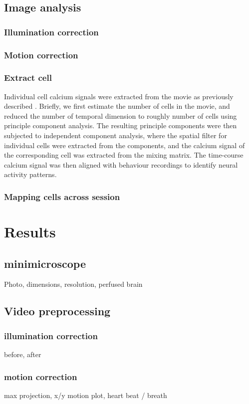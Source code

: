 \subsection{Image analysis}
\subsubsection{Illumination correction}
\subsubsection{Motion correction}
\subsubsection{Extract cell}
Individual cell calcium signals were extracted from the movie as previously described \citep{mukamel09}. Briefly, we first estimate the number of cells in the movie, and reduced the number of temporal dimension to roughly number of cells using principle component analysis. The resulting principle components were then subjected to independent component analysis, where the spatial filter for individual cells were extracted from the components, and the calcium signal of the corresponding cell was extracted from the mixing matrix. The time-course calcium signal was then aligned with behaviour recordings to identify neural activity patterns.
\subsubsection{Mapping cells across session}


\section{Results}


\subsection{minimicroscope}
Photo, dimensions, resolution, perfused brain

\subsection{Video preprocessing}
\subsubsection{illumination correction}
before, after
\subsubsection{motion correction}
max projection, x/y motion plot, heart beat / breath

